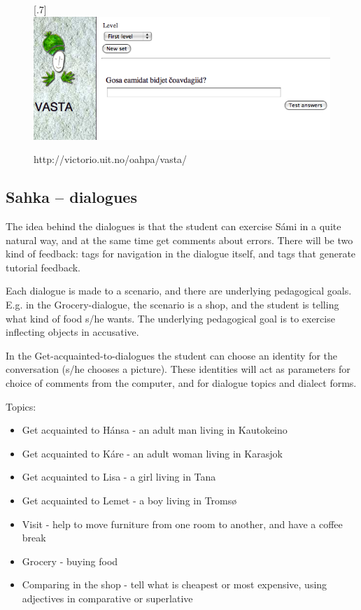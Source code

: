 \documentclass[a4paper,12pt]{article}
\begin{document}
\begin{figure}[htbp]
\begin{center}
\scalebox{.7}[.7]{\includegraphics{img/vasta.png}}\\
\caption{http://victorio.uit.no/oahpa/vasta/}
\label{vasta}
\end{center}
\end{figure}

	

\subsection{Sahka -- dialogues}
The idea behind the dialogues is that the student can exercise Sámi in a quite natural way, and at the same time get comments about errors. There will be two kind of feedback: tags for navigation in the dialogue itself, and tags that generate tutorial feedback.

Each dialogue is made to a scenario, and there are underlying pedagogical goals. E.g. in the Grocery-dialogue, the scenario is a shop, and the student is telling what kind of food s/he wants. The underlying pedagogical goal is to exercise inflecting objects in accusative.

In the Get-acquainted-to-dialogues the student can choose an identity for the conversation (s/he chooses a picture). These identities will act as parameters for choice of comments from the computer, and for dialogue topics and dialect forms.

\vspace{0.5cm}
	
Topics:
\begin{itemize}
\item Get acquainted to Hánsa - an adult man living in Kautokeino
\item Get acquainted to Káre - an adult woman living in Karasjok
\item Get acquainted to Lisa - a girl living in Tana
\item Get acquainted to Lemet - a boy living in Tromsø
\item Visit - help to move furniture from one room to another, and have a coffee break
\item Grocery - buying food
\item Comparing in the shop - tell what is cheapest or most expensive, using adjectives in comparative or superlative
\end{itemize}
\end{document}
